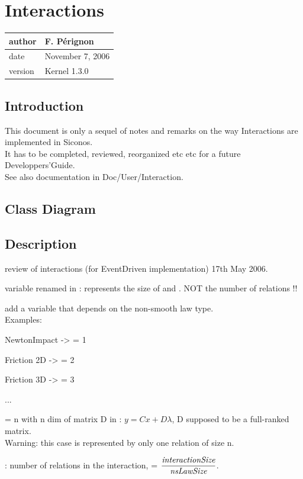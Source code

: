 \documentclass[10pt]{report}
\begin{document}
\chapter{Interactions}
\begin{table}[!ht]
  \begin{tabular}{|l|l|}
    \hline
    author  & F.  P\'erignon \\
    \hline
    date    & November 7, 2006 \\
    \hline
    version & Kernel 1.3.0 \\
    \hline
  \end{tabular}
\end{table}

\section{Introduction}
This document is only a sequel of notes and remarks on the way Interactions are implemented in Siconos.\\
It has to be completed, reviewed, reorganized etc etc for a future Developpers'Guide. \\
See also documentation in Doc/User/Interaction.

\section{Class Diagram}

\section{Description}

\begin{ndrfp}
review of interactions (for EventDriven implementation) 17th May 2006.
\end{ndrfp}

\bei
\item variable  renamed in : represents the size of  and \varcpp{$\lambda$}. NOT the number of relations !! \\
\item add a variable  that depends on the non-smooth law type.\\
Examples:
\bei
\item NewtonImpact ->  = 1
\item Friction 2D  ->  = 2
\item Friction 3D  ->  = 3
\item ...
\item {} = n with n dim of matrix D in :
$y=Cx+D\lambda$, D supposed to be a full-ranked matrix. \\
Warning: this case is represented by only one relation of size n.
\ei
\item {}: number of relations in the interaction,  = $\displaystyle \frac{\textit{interactionSize}}{\textit{nsLawSize}}$.
\ei
\end{document}
